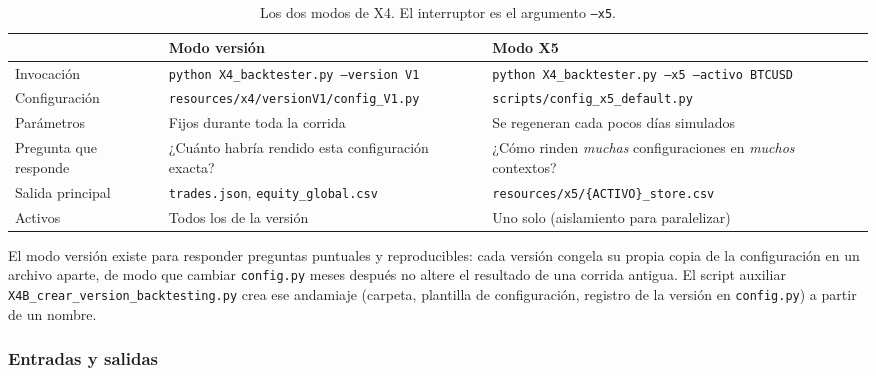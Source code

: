 \documentclass[11pt,a4paper]{article}
\newcommand{\code}[1]{\texttt{\small #1}}
\newcommand{\bigsep}{\par\vspace{3pt}}
\begin{document}
\begin{table}[h]
\centering
\small
\begin{tabularx}{\linewidth}{@{}l X X@{}}
\toprule
 & \textbf{Modo versión} & \textbf{Modo X5} \\
\midrule
Invocación & \code{python X4_backtester.py --version V1} & \code{python X4_backtester.py --x5 --activo BTCUSD} \\
Configuración & \code{resources/x4/versionV1/config_V1.py} & \code{scripts/config_x5_default.py} \\
Parámetros & Fijos durante toda la corrida & Se regeneran cada pocos días simulados \\
Pregunta que responde & ¿Cuánto habría rendido esta configuración exacta? & ¿Cómo rinden \textit{muchas} configuraciones en \textit{muchos} contextos? \\
Salida principal & \code{trades.json}, \code{equity_global.csv} & \code{resources/x5/\{ACTIVO\}_store.csv} \\
Activos & Todos los de la versión & Uno solo (aislamiento para paralelizar) \\
\bottomrule
\end{tabularx}
\caption{Los dos modos de X4. El interruptor es el argumento \code{--x5}.}
\label{tab:x4modos}
\end{table}

\bigsep
El modo versión existe para responder preguntas puntuales y reproducibles: cada versión
congela su propia copia de la configuración en un archivo aparte, de modo que cambiar
\code{config.py} meses después no altere el resultado de una corrida antigua. El script
auxiliar \code{X4B_crear_version_backtesting.py} crea ese andamiaje (carpeta, plantilla de
configuración, registro de la versión en \code{config.py}) a partir de un nombre.

\subsubsection{Entradas y salidas}
\end{document}
